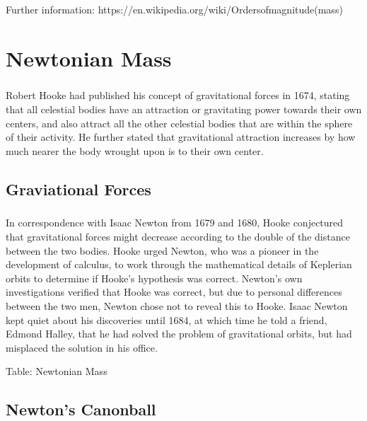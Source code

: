 \documentclass{book}
\begin{document}
    Further information: https://en.wikipedia.org/wiki/Ordersofmagnitude(mass)
    
    \chapter{Newtonian Mass}
    \paragraph{}
    Robert Hooke had published his concept of gravitational forces in 1674, stating that all celestial bodies have an attraction or gravitating power towards their own centers, and also attract all the other celestial bodies that are within the sphere of their activity. He further stated that gravitational attraction increases by how much nearer the body wrought upon is to their own center.
    
    \section{Graviational Forces}
    \paragraph{}
    In correspondence with Isaac Newton from 1679 and 1680, Hooke conjectured that gravitational forces might decrease according to the double of the distance between the two bodies. Hooke urged Newton, who was a pioneer in the development of calculus, to work through the mathematical details of Keplerian orbits to determine if Hooke's hypothesis was correct. Newton's own investigations verified that Hooke was correct, but due to personal differences between the two men, Newton chose not to reveal this to Hooke. Isaac Newton kept quiet about his discoveries until 1684, at which time he told a friend, Edmond Halley, that he had solved the problem of gravitational orbits, but had misplaced the solution in his office.
    
    Table: Newtonian Mass
    
    \section{Newton's Canonball}
\end{document}
